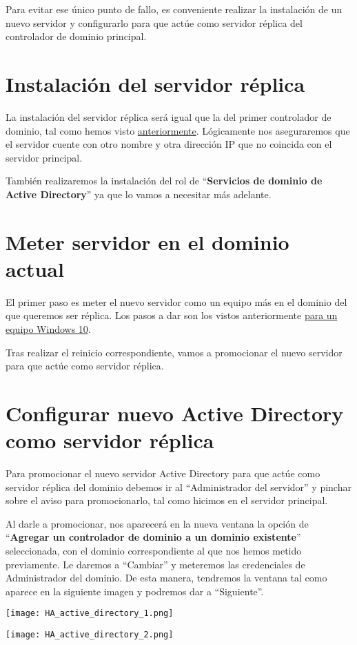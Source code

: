Para evitar ese único punto de fallo, es conveniente realizar la instalación de un nuevo servidor y configurarlo para que actúe como servidor réplica del controlador de dominio principal.


\section{Instalación del  servidor réplica}
La instalación del servidor réplica será igual que la del primer controlador de dominio, tal como hemos visto \hyperlink{instalar_windows_server}{anteriormente}. Lógicamente nos aseguraremos que el servidor cuente con otro nombre y otra dirección IP que no coincida con el servidor principal.

También realizaremos la instalación del rol de “\textbf{Servicios de dominio de Active Directory}” ya que lo vamos a necesitar más adelante.

\section{Meter servidor en el dominio actual}
El primer paso es meter el nuevo servidor como un equipo más en el dominio del que queremos ser réplica. Los pasos a dar son los vistos anteriormente \hyperlink{pasos_previos_windows_cliente}{para un equipo Windows 10}.

Tras realizar el reinicio correspondiente, vamos a promocionar el nuevo servidor para que actúe como servidor réplica.


\section{Configurar nuevo Active Directory como servidor réplica}
Para promocionar el nuevo servidor Active Directory para que actúe como servidor réplica del dominio debemos ir al “Administrador del servidor” y pinchar sobre el aviso para promocionarlo, tal como hicimos en el servidor principal.

Al darle a promocionar, nos aparecerá en la nueva ventana la opción de “\textbf{Agregar un controlador de dominio a un dominio existente}” seleccionada, con el dominio correspondiente al que nos hemos metido previamente. Le daremos a “Cambiar” y meteremos las credenciales de Administrador del dominio. De esta manera, tendremos la ventana tal como aparece en la siguiente imagen y podremos dar a “Siguiente”.


{
    \begin{minipage}{0.48\linewidth}
        \texttt{[image: HA\_active\_directory\_1.png]}
    \end{minipage}
    \hfill
    \begin{minipage}{0.48\linewidth}
        \texttt{[image: HA\_active\_directory\_2.png]}
    \end{minipage}
    \vspace{1em}
}



